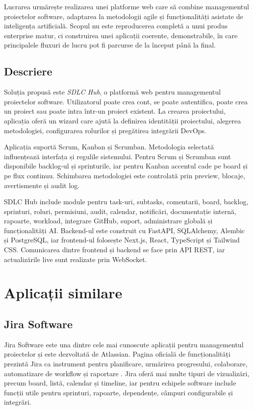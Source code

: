 \documentclass[12pt,a4paper]{report}
\begin{document}
Lucrarea urmărește realizarea unei platforme web care să combine managementul proiectelor software, adaptarea la metodologii agile și funcționalități asistate de inteligența artificială. Scopul nu este reproducerea completă a unui produs enterprise matur, ci construirea unei aplicații coerente, demonstrabile, în care principalele fluxuri de lucru pot fi parcurse de la început până la final.

\section{Descriere}
Soluția propusă este \textit{SDLC Hub}, o platformă web pentru managementul proiectelor software. Utilizatorul poate crea cont, se poate autentifica, poate crea un proiect sau poate intra într-un proiect existent. La crearea proiectului, aplicația oferă un wizard care ajută la definirea identității proiectului, alegerea metodologiei, configurarea rolurilor și pregătirea integrării DevOps.

Aplicația suportă Scrum, Kanban și Scrumban. Metodologia selectată influențează interfața și regulile sistemului. Pentru Scrum și Scrumban sunt disponibile backlog-ul și sprinturile, iar pentru Kanban accentul cade pe board și pe flux continuu. Schimbarea metodologiei este controlată prin preview, blocaje, avertismente și audit log.

SDLC Hub include module pentru task-uri, subtasks, comentarii, board, backlog, sprinturi, roluri, permisiuni, audit, calendar, notificări, documentație internă, rapoarte, workload, integrare GitHub, suport, administrare globală și funcționalități AI. Backend-ul este construit cu FastAPI, SQLAlchemy, Alembic și PostgreSQL, iar frontend-ul folosește Next.js, React, TypeScript și Tailwind CSS. Comunicarea dintre frontend și backend se face prin API REST, iar actualizările live sunt realizate prin WebSocket.


\chapter{Aplicații similare}
\label{chap:problematica}

\section{Jira Software}
Jira Software este una dintre cele mai cunoscute aplicații pentru managementul proiectelor și este dezvoltată de Atlassian. Pagina oficială de funcționalități prezintă Jira ca instrument pentru planificare, urmărirea progresului, colaborare, automatizare de workflow și raportare \cite{atlassianjira}. Jira oferă mai multe tipuri de vizualizări, precum board, listă, calendar și timeline, iar pentru echipele software include funcții utile pentru sprinturi, rapoarte, dependențe, câmpuri configurabile și integrări.
\end{document}
